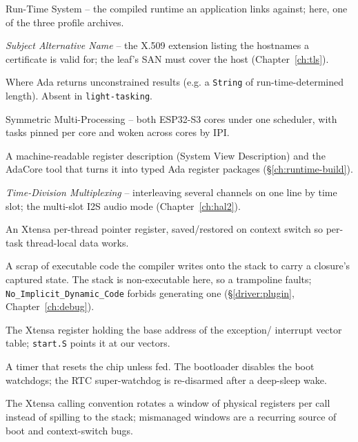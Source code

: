 \begin{description}[style=nextline, leftmargin=0pt]
\item[RTS] Run-Time System -- the compiled runtime an application links against;
  here, one of the three profile archives.

\item[SAN] \emph{Subject Alternative Name} -- the X.509 extension listing the hostnames a certificate is valid for; the leaf's SAN must cover the host (Chapter~\ref{ch:tls}).

\item[secondary stack] Where Ada returns unconstrained results (e.g. a
  \texttt{String} of run-time-determined length). Absent in \texttt{light-tasking}.

\item[SMP] Symmetric Multi-Processing -- both ESP32-S3 cores under one scheduler,
  with tasks pinned per core and woken across cores by IPI.

\item[SVD / \texttt{svd2ada}] A machine-readable register description (System View
  Description) and the AdaCore tool that turns it into typed Ada register packages
  (\S\ref{ch:runtime-build}).

\item[TDM] \emph{Time-Division Multiplexing} -- interleaving several channels on one line by time slot; the multi-slot I2S audio mode (Chapter~\ref{ch:hal2}).

\item[\texttt{THREADPTR}] An Xtensa per-thread pointer register, saved/restored on
  context switch so per-task thread-local data works.

\item[trampoline] A scrap of executable code the compiler writes onto the stack to
  carry a closure's captured state. The stack is non-executable here, so a
  trampoline faults; \texttt{No\_Implicit\_Dynamic\_Code} forbids generating one
  (\S\ref{driver:plugin}, Chapter~\ref{ch:debug}).

\item[VECBASE] The Xtensa register holding the base address of the exception/
  interrupt vector table; \texttt{start.S} points it at our vectors.

\item[watchdog (WDT)] A timer that resets the chip unless fed. The bootloader
  disables the boot watchdogs; the RTC super-watchdog is re-disarmed after a
  deep-sleep wake.

\item[window (register window)] The Xtensa calling convention rotates a window of
  physical registers per call instead of spilling to the stack; mismanaged
  windows are a recurring source of boot and context-switch bugs.


\end{description}
